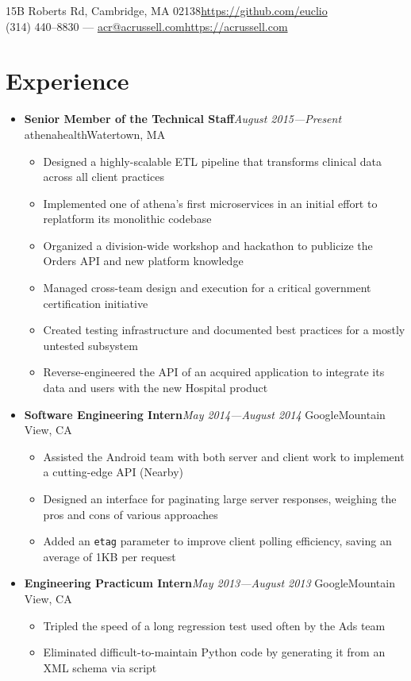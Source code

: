 \documentclass[10pt]{article}
\makeatletter
\newcommand{\name}{Andrew C. Russell}
\newcommand{\address}{15B Roberts Rd, Cambridge, MA 02138}
\newcommand{\telephone}{(314) 440--8830}
\newcommand{\email}{acr@acrussell.com}
\newcommand{\website}{https://acrussell.com}
\newcommand{\github}{https://github.com/euclio}
\newcommand\contact{{
    \begin{center}\noindent{\LARGE\textbf{\name}}\end{center}
    \address{}\hfill\url{\github}\\
    \telephone{} --- \url{\email}\hfill\url{\website}%
}}
\newcommand\divider{{
        \noindent\hrulefill{}%
}}
\newcommand\experienceentry[4]{%
\textbf{#3}\hfill\textit{#4}%
\newline#1\hfill#2%
}
\makeatother
\begin{document}
\pagestyle{empty}

\contact{}

\divider{}

\section*{Experience}
\begin{itemize}[label=,leftmargin=0pt]
    \item \experienceentry{athenahealth}{Watertown, MA}{Senior Member of the Technical Staff}{August 2015---Present}
        \begin{itemize}[topsep=4pt]
        \item Designed a highly-scalable ETL pipeline that transforms clinical
        data across all client practices
        \item Implemented one of athena's first microservices in an initial
        effort to replatform its monolithic codebase
        \item Organized a division-wide workshop and hackathon to publicize the
        Orders API and new platform knowledge
        \item Managed cross-team design and execution for a critical
        government certification initiative
        \item Created testing infrastructure and documented best practices for a
        mostly untested subsystem
        \item Reverse-engineered the API of an acquired application to integrate
        its data and users with the new Hospital product
        \end{itemize}
    \item \experienceentry{Google}{Mountain View, CA}
        {Software Engineering Intern}{May 2014---August 2014}
        \begin{itemize}[topsep=4pt]
            \item Assisted the Android team with both server and client work to
                implement a cutting-edge API (Nearby)
            \item Designed an interface for paginating large server responses,
            weighing the pros and cons of various approaches
            \item Added an \texttt{etag} parameter to improve client polling efficiency,
            saving an average of 1KB per request
        \end{itemize}
    \item \experienceentry{Google}{Mountain View, CA}
        {Engineering Practicum Intern}{May 2013---August 2013}
        \begin{itemize}[topsep=4pt]
            \item Tripled the speed of a long regression test used often by the
                Ads team
                \item Eliminated difficult-to-maintain Python code by generating
                it from an XML schema via script
        \end{itemize}
\end{itemize}
\end{document}
